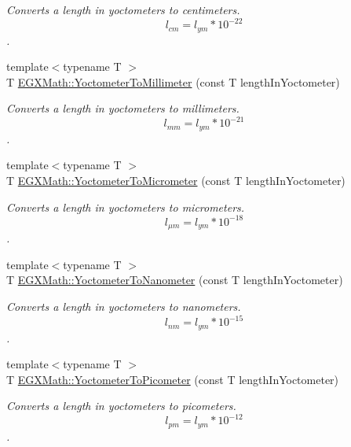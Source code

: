 \begin{DoxyCompactItemize}
\begin{DoxyCompactList}\small\item\em Converts a length in yoctometers to centimeters. \[ l_{cm}=l_{ym} * 10^{-22} \]. \end{DoxyCompactList}\item 
{\footnotesize template$<$typename T $>$ }\\T \mbox{\hyperlink{group___e_g_x_math-_conversions-_length_conversions-_s_i-_yoctometer-_s_i_ga599936dd87aba0a05d16c0c5992928ca}{E\+G\+X\+Math\+::\+Yoctometer\+To\+Millimeter}} (const T length\+In\+Yoctometer)
\begin{DoxyCompactList}\small\item\em Converts a length in yoctometers to millimeters. \[ l_{mm}=l_{ym} * 10^{-21} \]. \end{DoxyCompactList}\item 
{\footnotesize template$<$typename T $>$ }\\T \mbox{\hyperlink{group___e_g_x_math-_conversions-_length_conversions-_s_i-_yoctometer-_s_i_ga910145f68803fbaa87afd1d30d48c96e}{E\+G\+X\+Math\+::\+Yoctometer\+To\+Micrometer}} (const T length\+In\+Yoctometer)
\begin{DoxyCompactList}\small\item\em Converts a length in yoctometers to micrometers. \[ l_{\mu m}=l_{ym} * 10^{-18} \]. \end{DoxyCompactList}\item 
{\footnotesize template$<$typename T $>$ }\\T \mbox{\hyperlink{group___e_g_x_math-_conversions-_length_conversions-_s_i-_yoctometer-_s_i_ga209906b099f04d26a1487bedcac4f65d}{E\+G\+X\+Math\+::\+Yoctometer\+To\+Nanometer}} (const T length\+In\+Yoctometer)
\begin{DoxyCompactList}\small\item\em Converts a length in yoctometers to nanometers. \[ l_{nm}=l_{ym} * 10^{-15} \]. \end{DoxyCompactList}\item 
{\footnotesize template$<$typename T $>$ }\\T \mbox{\hyperlink{group___e_g_x_math-_conversions-_length_conversions-_s_i-_yoctometer-_s_i_gab621b78b78d6776131912bd6038901b9}{E\+G\+X\+Math\+::\+Yoctometer\+To\+Picometer}} (const T length\+In\+Yoctometer)
\begin{DoxyCompactList}\small\item\em Converts a length in yoctometers to picometers. \[ l_{pm}=l_{ym} * 10^{-12} \]. \end{DoxyCompactList}\item 

\end{DoxyCompactItemize}
